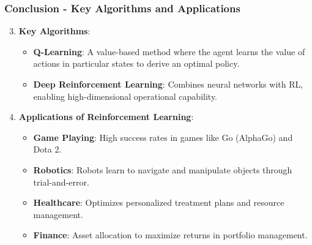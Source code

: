 \documentclass{beamer}
\begin{document}
\begin{frame}[fragile]
    \frametitle{Conclusion - Key Algorithms and Applications}
    \begin{enumerate}
        \setcounter{enumi}{2}
        \item \textbf{Key Algorithms}:
            \begin{itemize}
                \item \textbf{Q-Learning}: A value-based method where the agent learns the value of actions in particular states to derive an optimal policy.
                \item \textbf{Deep Reinforcement Learning}: Combines neural networks with RL, enabling high-dimensional operational capability.
            \end{itemize}

        \item \textbf{Applications of Reinforcement Learning}:
            \begin{itemize}
                \item \textbf{Game Playing}: High success rates in games like Go (AlphaGo) and Dota 2.
                \item \textbf{Robotics}: Robots learn to navigate and manipulate objects through trial-and-error.
                \item \textbf{Healthcare}: Optimizes personalized treatment plans and resource management.
                \item \textbf{Finance}: Asset allocation to maximize returns in portfolio management.
            \end{itemize}
    \end{enumerate}
\end{frame}
\end{document}
